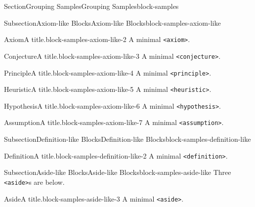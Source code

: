 \documentclass[twoside,10pt,]{article}
\newcommand{\mono}[1]{\texttt{#1}}
\numberwithin{equation}{section}
\begin{document}
\begin{sectionptx}{Section}{Grouping Samples}{}{Grouping Samples}{}{}{block-samples}
\typeout{************************************************}
%
\begin{subsectionptx}{Subsection}{Axiom-like Blocks}{}{Axiom-like Blocks}{}{}{block-samples-axiom-like}
\begin{axiom}{Axiom}{A title.}{}{block-samples-axiom-like-2}%
A minimal \mono{<axiom>}.%
\end{axiom}
\begin{conjecture}{Conjecture}{A title.}{}{block-samples-axiom-like-3}%
A minimal \mono{<conjecture>}.%
\end{conjecture}
\begin{principle}{Principle}{A title.}{}{block-samples-axiom-like-4}%
A minimal \mono{<principle>}.%
\end{principle}
\begin{heuristic}{Heuristic}{A title.}{}{block-samples-axiom-like-5}%
A minimal \mono{<heuristic>}.%
\end{heuristic}
\begin{hypothesis}{Hypothesis}{A title.}{}{block-samples-axiom-like-6}%
A minimal \mono{<hypothesis>}.%
\end{hypothesis}
\begin{assumption}{Assumption}{A title.}{}{block-samples-axiom-like-7}%
A minimal \mono{<assumption>}.%
\end{assumption}
\end{subsectionptx}
%
%
\typeout{************************************************}
\typeout{************************************************}
%
\begin{subsectionptx}{Subsection}{Definition-like Blocks}{}{Definition-like Blocks}{}{}{block-samples-definition-like}
\begin{definition}{Definition}{A title.}{block-samples-definition-like-2}%
A minimal \mono{<definition>}.%
\end{definition}
\end{subsectionptx}
%
%
\typeout{************************************************}
\typeout{************************************************}
%
\begin{subsectionptx}{Subsection}{Aside-like Blocks}{}{Aside-like Blocks}{}{}{block-samples-aside-like}
Three \mono{<aside>}s are below.%
\begin{aside}{Aside}{A title.}{block-samples-aside-like-3}%
A minimal \mono{<aside>}.%
\end{aside}

\end{subsectionptx}
\end{sectionptx}
\end{document}
